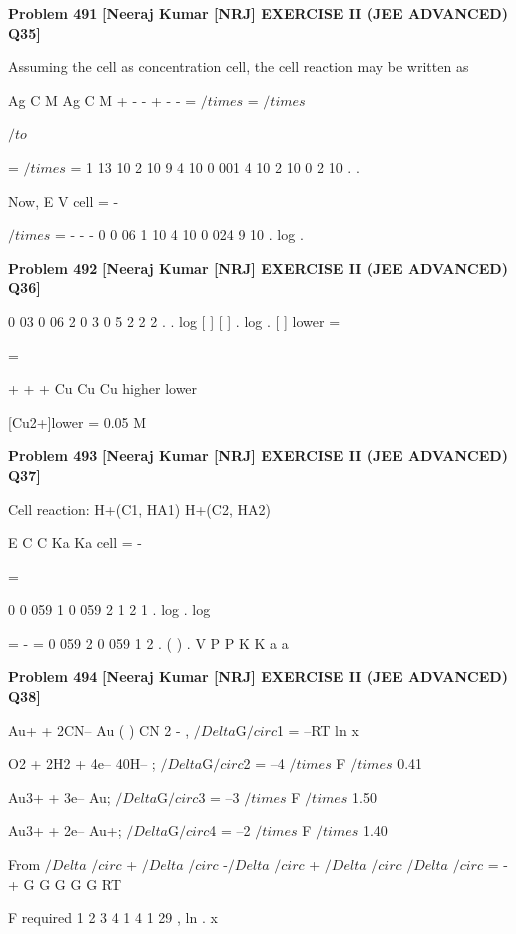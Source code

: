 \begin{problembox}
\textbf{Problem 491} \hfill \textbf{[Neeraj Kumar [NRJ] EXERCISE II (JEE ADVANCED) Q35]}
\label{q:ext-nrj_all_questions-491}

Assuming the cell as concentration cell, the cell 
reaction may be written as
 
 
Ag
C
M
Ag
C
M
+
-
-
+
-
-
=
$/times$
=
$/times$
 
  
 
  
 $/to$
 
=
$/times$
=
1
13
10
2
10
9
4
10
0 001
4
10
2
10
0 2
10
.
.
 
  
 
  
 
 Now, E
V
cell =
-
 
$/times$
= -
-
-
0
0 06
1
10
4
10
0 024
9
10
.
log
.
\end{problembox}

\begin{problembox}
\textbf{Problem 492} \hfill \textbf{[Neeraj Kumar [NRJ] EXERCISE II (JEE ADVANCED) Q36]}
\label{q:ext-nrj_all_questions-492}

0 03
0 06
2
0 3
0 5
2
2
2
.
.
log
[
]
[
]
.
log
.
[
]
lower
=
 
=
 
+
+
+
Cu
Cu
Cu
higher
lower
 
   [Cu2+]lower = 0.05 M
\end{problembox}

\begin{problembox}
\textbf{Problem 493} \hfill \textbf{[Neeraj Kumar [NRJ] EXERCISE II (JEE ADVANCED) Q37]}
\label{q:ext-nrj_all_questions-493}

Cell reaction: H+(C1, HA1) 
 H+(C2, HA2)
 
 
E
C
C
Ka
Ka
cell =
-
 
 
  
 
  =
 
0
0 059
1
0 059
2
1
2
1
.
log
.
log
 
 
=
-
=
0 059
2
0 059
1
2
.
(
)
.
V
P
P
K
K
a
a
\end{problembox}

\begin{problembox}
\textbf{Problem 494} \hfill \textbf{[Neeraj Kumar [NRJ] EXERCISE II (JEE ADVANCED) Q38]}
\label{q:ext-nrj_all_questions-494}

Au+ + 2CN--   Au (
)
CN 2
- , $/Delta$G$/circ$1 = --RT   ln x
 
 O2 + 2H2  + 4e--   40H-- ; $/Delta$G$/circ$2 = --4 $/times$ F $/times$ 0.41
 
 Au3+ + 3e--   Au; $/Delta$G$/circ$3 = --3 $/times$ F $/times$ 1.50
 
 Au3+ + 2e--   Au+; $/Delta$G$/circ$4 = --2 $/times$ F $/times$ 1.40
 
 From $/Delta$
$/circ$ +
$/Delta$
$/circ$ -$/Delta$
$/circ$ + $/Delta$
$/circ$
$/Delta$
$/circ$
= -
+
G
G
G
G
G
RT
 
F
required
1
2
3
4
1
4
1 29
,
ln
.
x
\end{problembox}

